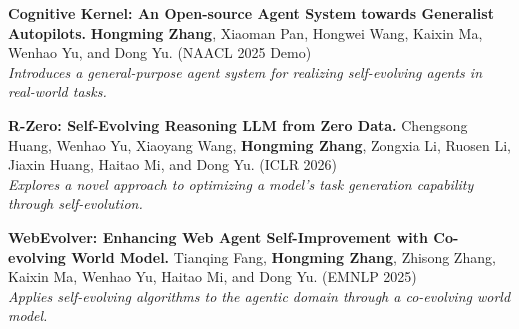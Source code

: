 

\begin{cvitems}
  \item {\textbf{Cognitive Kernel: An Open-source Agent System towards Generalist Autopilots.} \textbf{Hongming Zhang}, Xiaoman Pan, Hongwei Wang, Kaixin Ma, Wenhao Yu, and Dong Yu. (NAACL 2025 Demo)\\
  \hspace*{1.5em}\textit{Introduces a general-purpose agent system for realizing self-evolving agents in real-world tasks.}}
  \item {\textbf{R-Zero: Self-Evolving Reasoning LLM from Zero Data.} Chengsong Huang, Wenhao Yu, Xiaoyang Wang, \textbf{Hongming Zhang}, Zongxia Li, Ruosen Li, Jiaxin Huang, Haitao Mi, and Dong Yu. (ICLR 2026)\\
  \hspace*{1.5em}\textit{Explores a novel approach to optimizing a model's task generation capability through self-evolution.}}
  \item {\textbf{WebEvolver: Enhancing Web Agent Self-Improvement with Co-evolving World Model.} Tianqing Fang, \textbf{Hongming Zhang}, Zhisong Zhang, Kaixin Ma, Wenhao Yu, Haitao Mi, and Dong Yu. (EMNLP 2025)\\
  \hspace*{1.5em}\textit{Applies self-evolving algorithms to the agentic domain through a co-evolving world model.}}
\end{cvitems}

